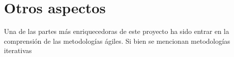 \section{Otros aspectos} %
\label{sec:otros_aspectos}

Una de las partes más enriquecedoras de este proyecto ha sido entrar en la comprensión de las metodologías ágiles. Si bien se mencionan metodologías iterativas 

